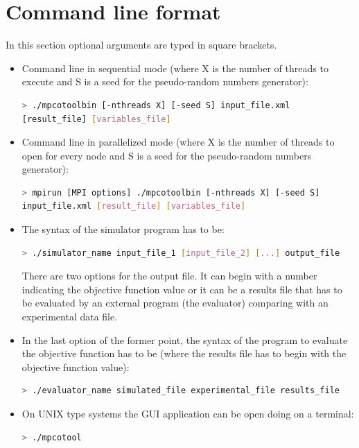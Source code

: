 \documentclass[a4paper]{report}
\begin{document}
\section{Command line format}

In this section optional arguments are typed in square brackets.

\begin{itemize}

\item Command line in sequential mode (where X is the number of threads to
execute and S is a seed for the pseudo-random numbers generator):
\begin{lstlisting}[language=bash,basicstyle=\scriptsize]
> ./mpcotoolbin [-nthreads X] [-seed S] input_file.xml
[result_file] [variables_file]
\end{lstlisting}

\item Command line in parallelized mode (where X is the number of threads to
open for every node and S is a seed for the pseudo-random numbers generator):
\begin{lstlisting}[language=bash,basicstyle=\scriptsize]
> mpirun [MPI options] ./mpcotoolbin [-nthreads X] [-seed S]
input_file.xml [result_file] [variables_file]
\end{lstlisting}

\item The syntax of the simulator program has to be:
\begin{lstlisting}[language=bash,basicstyle=\scriptsize]
> ./simulator_name input_file_1 [input_file_2] [...] output_file
\end{lstlisting}
There are two options for the output file. It can begin with a number indicating
the objective function value or it can be a results file that has to be
evaluated by an external program (the evaluator) comparing with an experimental
data file.

\item In the last option of the former point, the syntax of the program to
evaluate the objective function has to be (where the results file has to begin
with the objective function value):
\begin{lstlisting}[language=bash,basicstyle=\scriptsize]
> ./evaluator_name simulated_file experimental_file results_file
\end{lstlisting}

\item On UNIX type systems the GUI application can be open doing on a terminal:
\begin{lstlisting}[language=bash,basicstyle=\scriptsize]
> ./mpcotool
\end{lstlisting}

\end{itemize}
\end{document}
